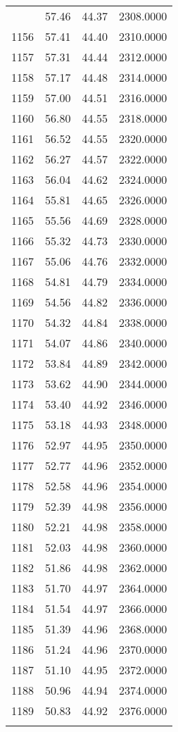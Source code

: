 \documentclass[
  captions=tableheading,
]{scrartcl}
\begin{document}
\begin{longtable} {l|l|l|l}
{1155 &	57.46 &	44.37 &	2308.0000\\
1156 &	57.41 &	44.40 &	2310.0000\\
1157 &	57.31 &	44.44 &	2312.0000\\
1158 &	57.17 &	44.48 &	2314.0000\\
1159 &	57.00 &	44.51 &	2316.0000\\
1160 &	56.80 &	44.55 &	2318.0000\\
1161 &	56.52 &	44.55 &	2320.0000\\
1162 &	56.27 &	44.57 &	2322.0000\\
1163 &	56.04 &	44.62 &	2324.0000\\
1164 &	55.81 &	44.65 &	2326.0000\\
1165 &	55.56 &	44.69 &	2328.0000\\
1166 &	55.32 &	44.73 &	2330.0000\\
1167 &	55.06 &	44.76 &	2332.0000\\
1168 &	54.81 &	44.79 &	2334.0000\\
1169 &	54.56 &	44.82 &	2336.0000\\
1170 &	54.32 &	44.84 &	2338.0000\\
1171 &	54.07 &	44.86 &	2340.0000\\
1172 &	53.84 &	44.89 &	2342.0000\\
1173 &	53.62 &	44.90 &	2344.0000\\
1174 &	53.40 &	44.92 &	2346.0000\\
1175 &	53.18 &	44.93 &	2348.0000\\
1176 &	52.97 &	44.95 &	2350.0000\\
1177 &	52.77 &	44.96 &	2352.0000\\
1178 &	52.58 &	44.96 &	2354.0000\\
1179 &	52.39 &	44.98 &	2356.0000\\
1180 &	52.21 &	44.98 &	2358.0000\\
1181 &	52.03 &	44.98 &	2360.0000\\
1182 &	51.86 &	44.98 &	2362.0000\\
1183 &	51.70 &	44.97 &	2364.0000\\
1184 &	51.54 &	44.97 &	2366.0000\\
1185 &	51.39 &	44.96 &	2368.0000\\
1186 &	51.24 &	44.96 &	2370.0000\\
1187 &	51.10 &	44.95 &	2372.0000\\
1188 &	50.96 &	44.94 &	2374.0000\\
1189 &	50.83 &	44.92 &	2376.0000\\
}
\end{longtable}
\end{document}
